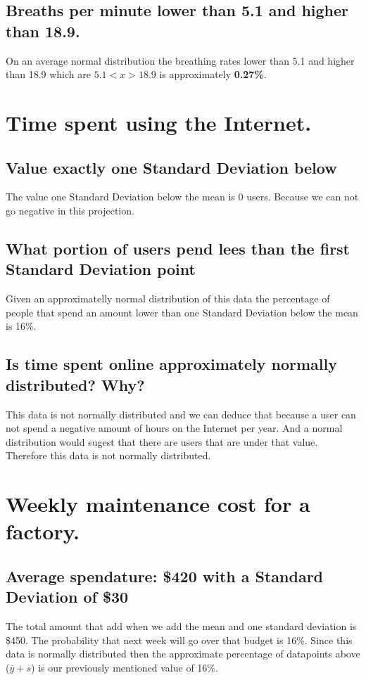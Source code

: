 \documentclass[a4paper,12px] {article}
\begin{document}
\subsection {Breaths per minute lower than 5.1 and higher than 18.9.}
On an average normal distribution the breathing rates lower than 5.1 and higher than 18.9 which are $5.1 < x > 18.9$ is approximately \textbf{0.27\%}.

\section{Time spent using the Internet.}
\subsection{Value exactly one Standard Deviation below}
The value one Standard Deviation below the mean is 0 users. Because we can not go negative in this projection.
\subsection{What portion of users pend lees than the first Standard Deviation point}
Given an approximatelly normal distribution of this data the percentage of people that spend an amount lower than one Standard Deviation below the mean is 16\%.
\subsection{Is time spent online approximately normally distributed? Why?}
This data is not normally distributed and we can deduce that because a user can not spend a negative amount of hours on the Internet per year. And a normal distribution would sugest that there
are users that are under that value. Therefore this data is not normally distributed.

\section{Weekly maintenance cost for a factory.}
\subsection{Average spendature: \$420 with a Standard Deviation of \$30}
The total amount that add when we add the mean and one standard deviation is \$450. The probability that next week will go over that budget is 16\%.
Since this data is normally distributed then the approximate percentage of datapoints above ($\overline y + s$) is our previously mentioned value of 16\%.
\end{document}
